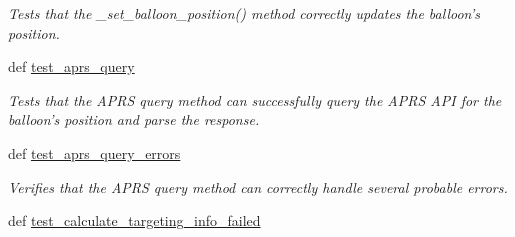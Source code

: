 \begin{DoxyCompactItemize}
\begin{DoxyCompactList}\small\item\em Tests that the \-\_\-set\-\_\-balloon\-\_\-position() method correctly updates the balloon's position. \end{DoxyCompactList}\item 
def \hyperlink{classhwm_1_1hardware_1_1devices_1_1drivers_1_1mxl__balloon__tracker_1_1tests_1_1test__mxl__ballo85cb9f09344d47402c35803686488a42_affdd230eaee42706ea524a5b1e1a115a}{test\-\_\-aprs\-\_\-query}
\begin{DoxyCompactList}\small\item\em Tests that the A\-P\-R\-S query method can successfully query the A\-P\-R\-S A\-P\-I for the balloon's position and parse the response. \end{DoxyCompactList}\item 
\hypertarget{classhwm_1_1hardware_1_1devices_1_1drivers_1_1mxl__balloon__tracker_1_1tests_1_1test__mxl__ballo85cb9f09344d47402c35803686488a42_a38f6dcb66d2491f0532ebd314f4ac3e9}{def \hyperlink{classhwm_1_1hardware_1_1devices_1_1drivers_1_1mxl__balloon__tracker_1_1tests_1_1test__mxl__ballo85cb9f09344d47402c35803686488a42_a38f6dcb66d2491f0532ebd314f4ac3e9}{test\-\_\-aprs\-\_\-query\-\_\-errors}}\label{classhwm_1_1hardware_1_1devices_1_1drivers_1_1mxl__balloon__tracker_1_1tests_1_1test__mxl__ballo85cb9f09344d47402c35803686488a42_a38f6dcb66d2491f0532ebd314f4ac3e9}

\begin{DoxyCompactList}\small\item\em Verifies that the A\-P\-R\-S query method can correctly handle several probable errors. \end{DoxyCompactList}\item 
\hypertarget{classhwm_1_1hardware_1_1devices_1_1drivers_1_1mxl__balloon__tracker_1_1tests_1_1test__mxl__ballo85cb9f09344d47402c35803686488a42_a18136abb43a993f1650bc3b20662a582}{def \hyperlink{classhwm_1_1hardware_1_1devices_1_1drivers_1_1mxl__balloon__tracker_1_1tests_1_1test__mxl__ballo85cb9f09344d47402c35803686488a42_a18136abb43a993f1650bc3b20662a582}{test\-\_\-calculate\-\_\-targeting\-\_\-info\-\_\-failed}}\label{classhwm_1_1hardware_1_1devices_1_1drivers_1_1mxl__balloon__tracker_1_1tests_1_1test__mxl__ballo85cb9f09344d47402c35803686488a42_a18136abb43a993f1650bc3b20662a582}


\end{DoxyCompactItemize}
